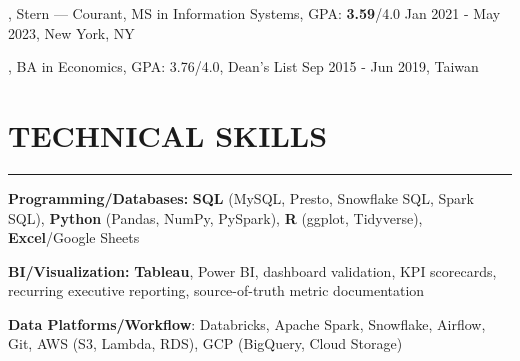 \documentclass[11pt,letterpaper]{article}
\begin{document}
\vspace{2pt}
, Stern --- Courant, MS in Information Systems, GPA: \textbf{3.59}/4.0 \hfill Jan 2021 - May 2023, New York, NY

\vspace{2pt}
, BA in Economics, GPA: 3.76/4.0, Dean's List \hfill Sep 2015 - Jun 2019, Taiwan

\vspace{0.3\baselineskip}
\section*{TECHNICAL SKILLS}
\vspace{-8pt}\noindent\rule{\textwidth}{0.8pt}

\vspace{2pt}
\noindent\textbf{Programming/Databases:} \textbf{SQL} (MySQL, Presto, Snowflake SQL, Spark SQL), \textbf{Python} (Pandas, NumPy, PySpark), \textbf{R} (ggplot, Tidyverse), \textbf{Excel}/Google Sheets

\vspace{2pt}
\noindent\textbf{BI/Visualization:} \textbf{Tableau}, Power BI, dashboard validation, KPI scorecards, recurring executive reporting, source-of-truth metric documentation

\vspace{2pt}
\noindent\textbf{Data Platforms/Workflow}: Databricks, Apache Spark, Snowflake, Airflow, Git, AWS (S3, Lambda, RDS), GCP (BigQuery, Cloud Storage)
\end{document}
